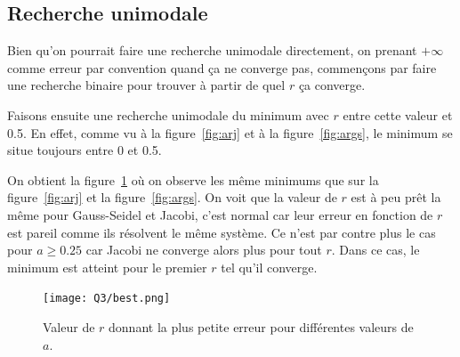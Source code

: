 \subsection{Recherche unimodale}
Bien qu'on pourrait faire une recherche unimodale directement, on prenant
$+\infty$ comme erreur par convention quand ça ne converge pas,
commençons par faire une recherche binaire pour trouver à partir de quel
$r$ ça converge.

Faisons ensuite une recherche unimodale du minimum
avec $r$ entre cette valeur et 0.5.
En effet, comme vu à la figure~\ref{fig:arj} et à la figure~\ref{fig:args},
le minimum se situe toujours entre 0 et 0.5.

On obtient la figure~\ref{fig:best} où on observe les même minimums que sur la figure~\ref{fig:arj}
et la figure~\ref{fig:args}.
On voit que la valeur de $r$ est à peu prêt la même pour Gauss-Seidel et Jacobi,
c'est normal car leur erreur en fonction de $r$ est pareil comme ils résolvent le même système.
Ce n'est par contre plus le cas pour $a \geq 0.25$ car Jacobi ne converge alors plus pour tout $r$.
Dans ce cas, le minimum est atteint pour le premier $r$ tel qu'il converge.

\begin{figure}
  \centering
  \texttt{[image: Q3/best.png]}
  \caption{Valeur de $r$ donnant la plus petite erreur pour différentes valeurs de $a$.}
  \label{fig:best}
\end{figure}
